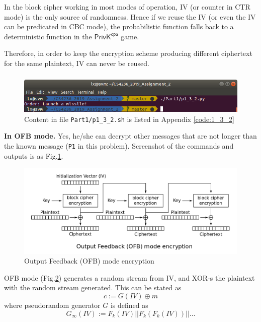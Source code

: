 In the block cipher working in most modes of operation, IV (or counter in CTR mode) is the only source of randomness.
Hence if we reuse the IV (or even the IV can be predicated in CBC mode), the probabilistic function falls back to a deterministic function in the $\mathsf{PrivK}^{\mathsf{cpa}}$ game.

Therefore, in order to keep the encryption scheme producing different ciphertext for the same plaintext, IV can never be reused.

\subsubsection{}

\begin{figure}[t!]
\centering
\includegraphics[width=\columnwidth]{pictures/p1_3_2.png}
\caption{
    Content in file \texttt{Part1/p1\_3\_2.sh} is listed in Appendix \ref{code:1_3_2}
}
\label{fig:p1_3_2}
\end{figure}

\textbf{In OFB mode.}
Yes, he/she can decrypt other messages that are not longer than the known message (\texttt{P1} in this problem). Screenshot of the commands and outputs is as Fig.\ref{fig:p1_3_2}.

\begin{figure}[ht!]
\centering
\includegraphics[width=\columnwidth]{pictures/OFB_encryption.png}
\caption{
    Output Feedback (OFB) mode encryption
}
\label{fig:OFB_encryption}
\end{figure}

OFB mode (Fig.\ref{fig:OFB_encryption}) generates a random stream from IV, and XOR-s the plaintext with the random stream generated. 
This can be stated as $$ c := G(IV) \oplus m $$ where pseudorandom generator $G$ is defined as $$
G_\infty(IV) := F_k(IV) || F_k(F_k(IV)) || \ldots
$$

